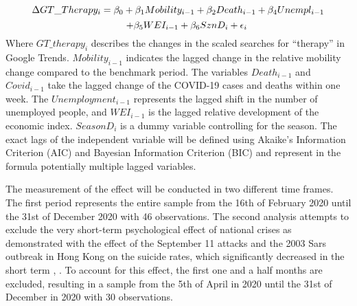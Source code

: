 \[
\Delta GT\_Therapy_i = 
\small{\beta_0 + \beta_1 Mobility_{i-1} + \beta_2 Death_{i-1} + \beta_4 Unempl_{i-1}}
\]
\[
\hspace{17px}\small{+\beta_5 WEI_{i-1} + \beta_6 SznD_i + \epsilon_i}
\]
Where $GT\_therapy_i$ describes the changes in the scaled searches for “therapy” in Google Trends. $Mobility_{i-1}$ indicates the lagged change in the relative mobility change compared to the benchmark period. The variables $Death_{i-1}$ and $Covid_{i-1}$ take the lagged change of the COVID-19 cases and deaths within one week. The $Unemployment_{i-1}$ represents the lagged shift in the number of unemployed people, and $WEI_{i-1}$ is the lagged relative development of the economic index. $SeasonD_i$ is a dummy variable controlling for the season. The exact lags of the independent variable will be defined using Akaike’s Information Criterion (AIC) and Bayesian Information Criterion (BIC) and represent in the formula potentially multiple lagged variables.

The measurement of the effect will be conducted in two different time frames. The first period represents the entire sample from the 16th of February 2020 until the 31st of December 2020 with 46 observations. The second analysis attempts to exclude the very short-term psychological effect of national crises as demonstrated with the effect of the September 11 attacks and the 2003 Sars outbreak in Hong Kong on the suicide rates, which significantly decreased in the short term \citep{claassen_carmody_stewart_bossarte_larkin_woodward_trivedi_2010}, \citep{Cheung_Chau_Yip2008}. To account for this effect, the first one and a half months are excluded, resulting in a sample from the 5th of April in 2020 until the 31st of December in 2020 with 30 observations.


\newpage




